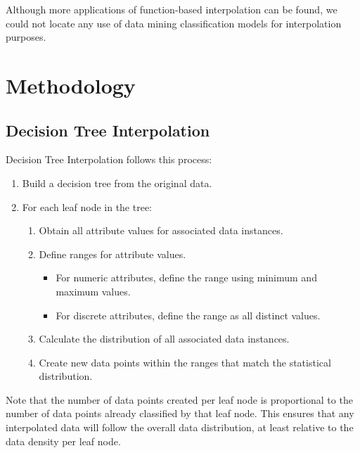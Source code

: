 \documentclass{sig-alternate}
\begin{document}
Although more applications of function-based interpolation can be found, we could not locate any use of data mining classification models for interpolation purposes.

\section{Methodology}
\subsection{Decision Tree Interpolation}
Decision Tree Interpolation follows this process:
\begin{enumerate}
    \item Build a decision tree from the original data.
    \item For each leaf node in the tree:
    \begin{enumerate}
        \item Obtain all attribute values for associated data instances.
        \item Define ranges for attribute values.
        \begin{itemize}
            \item For numeric attributes, define the range using minimum and maximum values.
            \item For discrete attributes, define the range as all distinct values.
        \end{itemize}
        \item Calculate the distribution of all associated data instances.
        \item Create new data points within the ranges that match the statistical distribution.
    \end{enumerate}
\end{enumerate}
Note that the number of data points created per leaf node is proportional to the number of data points already classified by that leaf node. This ensures that any interpolated data will follow the overall data distribution, at least relative to the data density per leaf node. 
\end{document}
